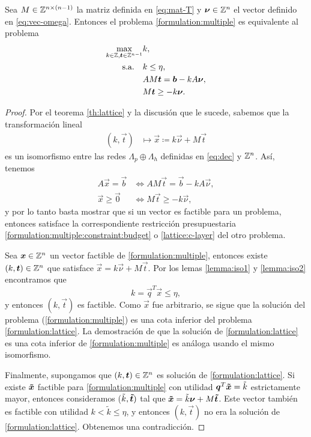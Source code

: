 \begin{theorem}
	\label{th:multeq}
	Sea $M \in \mathbb{Z}^{n \times (n - 1)}$ la matriz definida en \eqref{eq:mat-T} y $\boldsymbol{\nu} \in \mathbb{Z}^n$
	el vector definido en \eqref{eq:vec-omega}. Entonces el problema \eqref{formulation:multiple} es
	equivalente al problema
	\begin{subequations}
		\label{formulation:lattice}
		\begin{align}
			\max_{k \in \mathbb{Z}, \boldsymbol{t} \in \mathbb{Z}^{n-1}}
				& k, \\
			\text{s.a.} \quad
				& k \leq \eta, \label{lattice:c-layer} \\
				& AM\boldsymbol{t} = \boldsymbol{b} - kA\boldsymbol{\nu}, \label{lattice:constraints} \\
				& M\boldsymbol{t} \geq -k\boldsymbol{\nu}.
		\end{align}
	\end{subequations}
\end{theorem}
\begin{proof}
	Por el teorema \ref{th:lattice} y la discusión que le sucede, sabemos que la transformación
	lineal
	\begin{align*}
		(k, \vec{t}) &\mapsto \vec{x} \coloneq k\vec{\nu} + M\vec{t}
	\end{align*}
	es un isomorfismo entre las redes $\Lambda_p \oplus \Lambda_h$ definidas en \eqref{eq:dec} y
	$\mathbb{Z}^n$. Así, tenemos
	\begin{align*}
		A\vec{x} = \vec{b} &\iff AM\vec{t} = \vec{b} - kA\vec{\nu}, \\
		\vec{x} \geq \vec{0} &\iff M\vec{t} \geq -k\vec{\nu},
	\end{align*}
	y por lo tanto basta mostrar que si un vector es factible para un problema, entonces satisface
	la correspondiente restricción presupuestaria \eqref{formulation:multiple:constraint:budget} o
	\eqref{lattice:c-layer} del otro problema.

	Sea $\boldsymbol{x} \in \mathbb{Z}^n$ un vector factible de \eqref{formulation:multiple}, entonces existe $(k,
	\boldsymbol{t}) \in \mathbb{Z}^n$ que satisface $\vec{x} = k\vec{\nu} + M\vec{t}$. Por los lemas \ref{lemma:iso1}
	y \ref{lemma:iso2} encontramos que
	\begin{equation*}
		k = \vec{q}^T\vec{x} \leq \eta,
	\end{equation*}
	y entonces $(k, \vec{t})$ es factible. Como $\vec{x}$ fue arbitrario, se sigue que la solución
	del problema (\ref{formulation:multiple}) es una cota inferior del problema
	\eqref{formulation:lattice}. La demostración de que la solución de \eqref{formulation:lattice}
	es una cota inferior de \eqref{formulation:multiple} es análoga usando el mismo isomorfismo.

	Finalmente, supongamos que $(k, \boldsymbol{t}) \in \mathbb{Z}^n$ es solución de \eqref{formulation:lattice}.
	Si existe $\boldsymbol{\tilde{x}}$ factible para \eqref{formulation:multiple} con utilidad $\boldsymbol{q}^T\boldsymbol{\tilde{x}}
	= \tilde{k}$ estrictamente mayor, entonces consideramos ($\tilde{k}, \boldsymbol{\tilde{t}})$ tal que
	$\boldsymbol{\tilde{x}} = \tilde{k}\boldsymbol{\nu} + M\boldsymbol{\tilde{t}}$. Este vector también es factible con utilidad $k <
	\tilde{k} \leq \eta$, y entonces $(k, \vec{t})$ no era la solución de
	\eqref{formulation:lattice}. Obtenemos una contradicción.
\end{proof}


